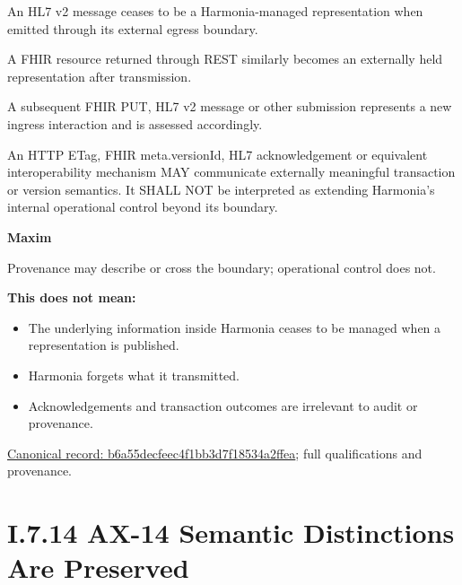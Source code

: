 An HL7 v2 message ceases to be a Harmonia-managed representation when
emitted through its external egress boundary.



A FHIR resource returned through REST similarly becomes an externally
held representation after transmission.



A subsequent FHIR PUT, HL7 v2 message or other submission represents a
new ingress interaction and is assessed accordingly.



An HTTP ETag, FHIR meta.versionId, HL7 acknowledgement or equivalent
interoperability mechanism MAY communicate externally meaningful
transaction or version semantics. It SHALL NOT be interpreted as
extending Harmonia's internal operational control beyond its boundary.



\par\medskip\textbf{Maxim}\par


Provenance may describe or cross the boundary; operational control does
not.



\textbf{This does not mean:}



\begin{itemize}


\item The underlying information inside Harmonia ceases to be managed when a representation is published.

\item Harmonia forgets what it transmitted.

\item Acknowledgements and transaction outcomes are irrelevant to audit or provenance.

\end{itemize}

{\footnotesize \href{../../../../continuum/motivation/principle/b6a55decfeec4f1bb3d7f18534a2ffea.md}{Canonical record: b6a55decfeec4f1bb3d7f18534a2ffea}; full qualifications and provenance.}\par
\section*{I.7.14 AX-14 Semantic Distinctions Are Preserved}
\label{navigation:I.7.14}


